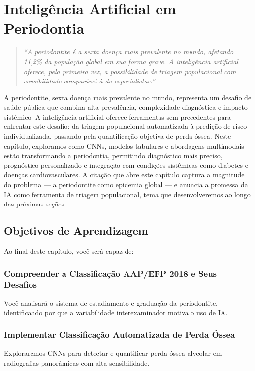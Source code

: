 \chapter{Inteligência Artificial em Periodontia}
\label{cap:periodontia-ia}
\niveltres

\begin{quote}
\textit{``A periodontite é a sexta doença mais prevalente no mundo, afetando 11,2\% da população global em sua forma grave. A inteligência artificial oferece, pela primeira vez, a possibilidade de triagem populacional com sensibilidade comparável à de especialistas.''}
\end{quote}

A periodontite, sexta doença mais prevalente no mundo, representa um desafio de saúde pública que combina alta prevalência, complexidade diagnóstica e impacto sistêmico. A inteligência artificial oferece ferramentas sem precedentes para enfrentar este desafio: da triagem populacional automatizada à predição de risco individualizada, passando pela quantificação objetiva de perda óssea. Neste capítulo, exploramos como CNNs, modelos tabulares e abordagens multimodais estão transformando a periodontia, permitindo diagnóstico mais preciso, prognóstico personalizado e integração com condições sistêmicas como diabetes e doenças cardiovasculares. A citação que abre este capítulo captura a magnitude do problema --- a periodontite como epidemia global --- e anuncia a promessa da IA como ferramenta de triagem populacional, tema que desenvolveremos ao longo das próximas seções.

\section{Objetivos de Aprendizagem}

Ao final deste capítulo, você será capaz de:

\subsection{Compreender a Classificação AAP/EFP 2018 e Seus Desafios}
Você analisará o sistema de estadiamento e graduação da periodontite, identificando por que a variabilidade interexaminador motiva o uso de IA.

\subsection{Implementar Classificação Automatizada de Perda Óssea}
Exploraremos CNNs para detectar e quantificar perda óssea alveolar em radiografias panorâmicas com alta sensibilidade.

